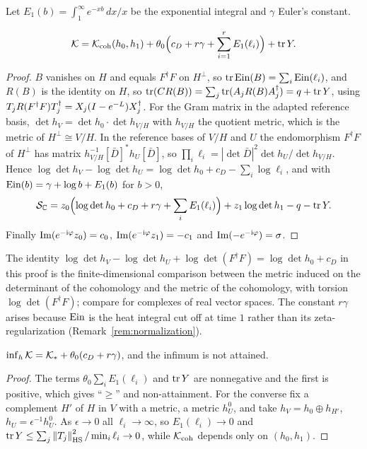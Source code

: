 Let $E_1(b)=\int_1^\infty e^{-xb}\,dx/x$ be the exponential integral and
$\gamma$ Euler's constant.

\begin{proposition}[Decomposition]\label{prop:decomposition}
\[
 \mathcal K=\mathcal K_{\mathrm{coh}}(h_0,h_1)+\theta_0\Bigl(c_D+r\gamma+\sum_{i=1}^rE_1(\ell_i)\Bigr)
 +\operatorname{tr} Y .
\]
\end{proposition}

\begin{proof}
$B$ vanishes on $H$ and equals $F^\dagger F$ on $H^\perp$, so
$\operatorname{tr}\operatorname{Ein}(B)=\sum_i\operatorname{Ein}(\ell_i)$, and $R(B)$ is the identity on $H$, so
$\operatorname{tr}(CR(B))=\sum_j\operatorname{tr}(A_jR(B)A_j^\dagger)=q+\operatorname{tr} Y$, using
$T_jR(F^\dagger F)T_j^\dagger=X_j(I-e^{-L})X_j^\dagger$. For the Gram matrix
in the adapted reference basis, $\det h_V=\det h_0\cdot\det h_{V/H}$ with
$h_{V/H}$ the quotient metric, which is the metric of $H^\perp\cong V/H$. In
the reference bases of $V/H$ and $U$ the endomorphism $F^\dagger F$ of
$H^\perp$ has matrix $h_{V/H}^{-1}[\bar D]^*h_U[\bar D]$, so
$\prod_i\ell_i=|\det\bar D|^2\det h_U/\det h_{V/H}$. Hence
$\log\det h_V-\log\det h_U=\log\det h_0+c_D-\sum_i\log\ell_i$, and with
$\operatorname{Ein}(b)=\gamma+\log b+E_1(b)$ for $b>0$,
\[
 \mathcal S_{\mathbb C}=z_0\Bigl(\log\det h_0+c_D+r\gamma+\sum_iE_1(\ell_i)\Bigr)
 +z_1\log\det h_1-q-\operatorname{tr} Y .
\]
Finally $\operatorname{Im}(e^{-\mathrm i\varphi}z_0)=c_0$, $\operatorname{Im}(e^{-\mathrm i\varphi}z_1)=-c_1$ and
$\operatorname{Im}(-e^{-\mathrm i\varphi})=\sigma$.
\end{proof}

The identity
$\log\det h_V-\log\det h_U+\log\det(F^\dagger F)=\log\det h_0+c_D$ in this
proof is the finite-dimensional comparison between the metric induced on the
determinant of the cohomology and the metric of the cohomology, with torsion
$\log\det(F^\dagger F)$; compare \cite[Theorem~1.1]{bz92} for complexes of
real vector spaces. The constant $r\gamma$ arises because $\operatorname{Ein}$ is the heat
integral cut off at time $1$ rather than its zeta-regularization
(Remark~\ref{rem:normalization}).

\begin{corollary}\label{cor:infimum}
$\inf_h\mathcal K=\mathcal K_*+\theta_0(c_D+r\gamma)$, and the infimum is not attained.
\end{corollary}

\begin{proof}
The terms $\theta_0\sum_iE_1(\ell_i)$ and $\operatorname{tr} Y$ are nonnegative and the
first is positive, which gives ``$\geq$'' and non-attainment. For the
converse fix a complement $H'$ of $H$ in $V$ with a metric, a metric $h_U^0$,
and take $h_V=h_0\oplus h_{H'}$, $h_U=\epsilon^{-1}h_U^0$. As $\epsilon\to0$
all $\ell_i\to\infty$, so $E_1(\ell_i)\to0$ and
$\operatorname{tr} Y\leq\sum_j\left\lVert T_j\right\rVert_{\mathrm{HS}}^2/\min_i\ell_i\to0$, while $\mathcal K_{\mathrm{coh}}$
depends only on $(h_0,h_1)$.
\end{proof}


